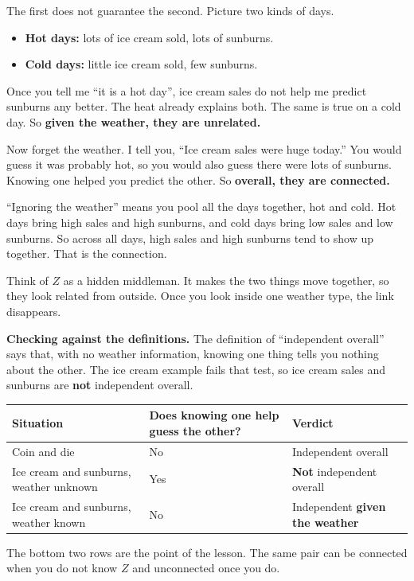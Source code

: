 The first does not guarantee the second. Picture two kinds of days.
\begin{itemize}
  \item \textbf{Hot days:} lots of ice cream sold, lots of sunburns.
  \item \textbf{Cold days:} little ice cream sold, few sunburns.
\end{itemize}

Once you tell me ``it is a hot day'', ice cream sales do not help me predict sunburns any better. The heat already explains both. The same is true on a cold day. So \textbf{given the weather, they are unrelated.}

Now forget the weather. I tell you, ``Ice cream sales were huge today.'' You would guess it was probably hot, so you would also guess there were lots of sunburns. Knowing one helped you predict the other. So \textbf{overall, they are connected.}

``Ignoring the weather'' means you pool all the days together, hot and cold. Hot days bring high sales and high sunburns, and cold days bring low sales and low sunburns. So across all days, high sales and high sunburns tend to show up together. That is the connection.

Think of $Z$ as a hidden middleman. It makes the two things move together, so they look related from outside. Once you look inside one weather type, the link disappears.

\textbf{Checking against the definitions.} The definition of ``independent overall'' says that, with no weather information, knowing one thing tells you nothing about the other. The ice cream example fails that test, so ice cream sales and sunburns are \textbf{not} independent overall.

\begin{tabular}{@{}p{5.2cm}p{5.2cm}p{5.2cm}@{}}
\toprule
Situation & Does knowing one help guess the other? & Verdict \\
\midrule
Coin and die & No & Independent overall \\
Ice cream and sunburns, weather unknown & Yes & \textbf{Not} independent overall \\
Ice cream and sunburns, weather known & No & Independent \textbf{given the weather} \\
\bottomrule
\end{tabular}

The bottom two rows are the point of the lesson. The same pair can be connected when you do not know $Z$ and unconnected once you do.

